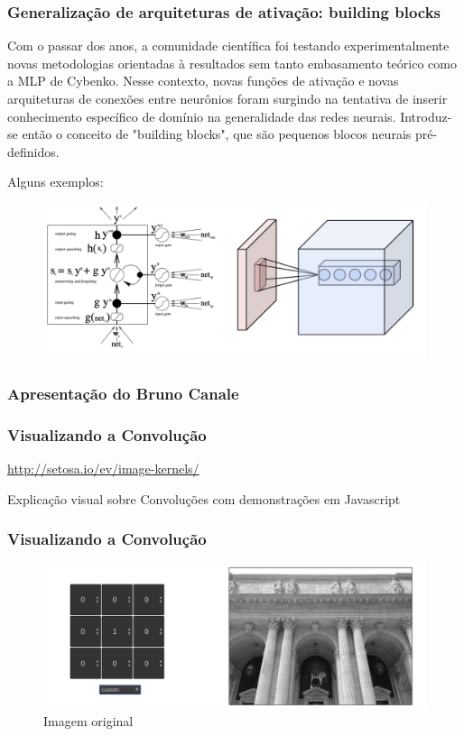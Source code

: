 \documentclass[tikz,10pt]{beamer}
\begin{document}
\begin{frame}
	\frametitle{Generalização de arquiteturas de ativação: building blocks}
	
Com o passar dos anos, a comunidade científica foi testando experimentalmente novas metodologias orientadas à     resultados sem tanto embasamento teórico como a MLP de Cybenko. Nesse contexto, novas funções de ativação e       novas arquiteturas de conexões entre neurônios foram surgindo na tentativa de inserir conhecimento específico     de domínio na generalidade das redes neurais. Introduz-se então o conceito de "building blocks", que são pequenos blocos neurais pré-definidos.

Alguns exemplos:

	 \begin{figure}
	\centering
	\includegraphics[scale=0.3]{blocks.png}
	\end{figure}
	
	
\end{frame}

\begin{frame}
	\frametitle{Apresentação do Bruno Canale}
\end{frame}


\begin{frame}
	\frametitle{Visualizando a Convolução}
	\centering
	\par \url{http://setosa.io/ev/image-kernels/}
	\par Explicação visual sobre Convoluções com demonstrações em Javascript
\end{frame}



\begin{frame}
	\frametitle{Visualizando a Convolução}
	\centering
\begin{figure}
	\centering
	\includegraphics[width=1.0\linewidth]{images/convolucao/001_sem_filtro}
	\caption{Imagem original}
	\label{fig:001semfiltro}
\end{figure}

\end{frame}
\end{document}
